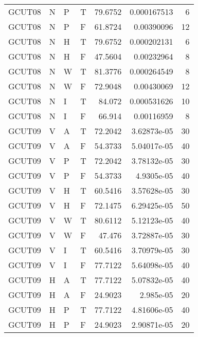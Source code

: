 \begin{longtable}{llllrrr}
    GCUT08   & N     & P     & T          & 79.6752    & 0.000167513 & 6        \\
    GCUT08   & N     & P     & F          & 61.8724    & 0.00390096  & 12       \\
    GCUT08   & N     & H     & T          & 79.6752    & 0.000202131 & 6        \\
    GCUT08   & N     & H     & F          & 47.5604    & 0.00232964  & 8        \\
    GCUT08   & N     & W     & T          & 81.3776    & 0.000264549 & 8        \\
    GCUT08   & N     & W     & F          & 72.9048    & 0.00430069  & 12       \\
    GCUT08   & N     & I     & T          & 84.072     & 0.000531626 & 10       \\
    GCUT08   & N     & I     & F          & 66.914     & 0.00116959  & 8        \\
    GCUT09   & V     & A     & T          & 72.2042    & 3.62873e-05 & 30       \\
    GCUT09   & V     & A     & F          & 54.3733    & 5.04017e-05 & 40       \\
    GCUT09   & V     & P     & T          & 72.2042    & 3.78132e-05 & 30       \\
    GCUT09   & V     & P     & F          & 54.3733    & 4.9305e-05  & 40       \\
    GCUT09   & V     & H     & T          & 60.5416    & 3.57628e-05 & 30       \\
    GCUT09   & V     & H     & F          & 72.1475    & 6.29425e-05 & 50       \\
    GCUT09   & V     & W     & T          & 80.6112    & 5.12123e-05 & 40       \\
    GCUT09   & V     & W     & F          & 47.476     & 3.72887e-05 & 30       \\
    GCUT09   & V     & I     & T          & 60.5416    & 3.70979e-05 & 30       \\
    GCUT09   & V     & I     & F          & 77.7122    & 5.64098e-05 & 40       \\
    GCUT09   & H     & A     & T          & 77.7122    & 5.07832e-05 & 40       \\
    GCUT09   & H     & A     & F          & 24.9023    & 2.985e-05   & 20       \\
    GCUT09   & H     & P     & T          & 77.7122    & 4.81606e-05 & 40       \\
    GCUT09   & H     & P     & F          & 24.9023    & 2.90871e-05 & 20       \\

\end{longtable}
